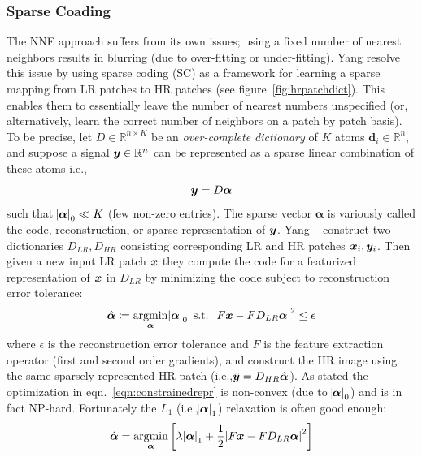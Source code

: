 \subsubsection{Sparse Coading}
The NNE approach suffers from its own issues; using a fixed number of nearest neighbors results in blurring (due to over-fitting or under-fitting).
%
Yang \etal\cite{yang2008} resolve this issue by using sparse coding (SC) as a framework for learning a sparse mapping from LR patches to HR patches (see figure~\ref{fig:hrpatchdict}).
%
This enables them to essentially leave the number of nearest numbers unspecified (or, alternatively, learn the correct number of neighbors on a patch by patch basis).
%
To be precise, let \(D \in \mathbb{R}^{n \times K}\) be an \textit{over-complete dictionary} of \(K\) atoms \(\bm{d}_i \in \mathbb{R}^n\), and suppose a signal \(\bm{y} \in \mathbb{R}^n\) can be represented as a sparse linear combination of these atoms i.e.,\begin{equation}
	\bm{y} = D\bm{\alpha}
\end{equation}
such that \(\abs{ \bm{\alpha} }_0 \ll K\) (few non-zero entries).
%
The sparse vector \(\bm{\alpha}\) is variously called the code, reconstruction, or sparse representation of \(\bm{y}\).
%
Yang \etal~ construct two dictionaries \(D_{LR}, D_{HR}\) consisting corresponding LR and HR patches \(\bm{x}_i, \bm{y}_i\).
%
Then given a new input LR patch \(\bm{x}\) they compute the code for a featurized representation of \(\bm{x}\) in \(D_{LR}\) by minimizing the code subject to reconstruction error tolerance:
\begin{equation}
	\hat{\bm{\alpha}} \coloneqq \underset{\bm{\alpha}}{\text{argmin}} \abs{ \bm{\alpha} }_0 \text{ s.t. } \abs{ F\bx - FD_{LR}\bm{\alpha} }^2 \leq \epsilon
	\label{eqn:constrainedrepr}
\end{equation}
where \(\epsilon\) is the reconstruction error tolerance and \(F\) is the feature extraction operator (first and second order gradients), and construct the HR image using the same sparsely represented HR patch (i.e.,\(\hat{\bm{y}} = D_{HR} \hat{\bm{\alpha}}\)).
%
As stated the optimization in eqn.~\eqref{eqn:constrainedrepr} is non-convex (due to \(\abs{ \bm{\alpha} }_0\)) and is in fact NP-hard\cite{tilman2015}.
%
Fortunately the \(L_1\) (i.e.,\(\abs{ \bm{\alpha} }_1\)) relaxation is often good enough\cite{Donoho9446}:
\begin{equation}
	\hat{\bm{\alpha}} = \underset{\bm{\alpha}}{\text{argmin}} \left[ \lambda\abs{ \bm{\alpha} }_1 + \frac{1}{2}\abs{ F\bx - FD_{LR}\bm{\alpha} }^2 \right]
	\label{eqn:lagrangerepr}
\end{equation}
